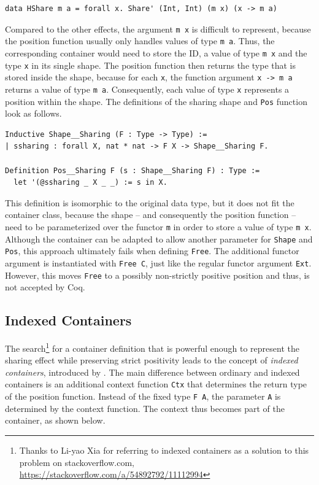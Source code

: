\documentclass[a4paper, 11pt, fleqn, twoside]{scrreprt}
\newcommand{\hinl}[1]{\texttt{#1}}
\newcommand{\cinl}[1]{\texttt{#1}}
\begin{document}
\begin{verbatim}
data HShare m a = forall x. Share' (Int, Int) (m x) (x -> m a)
\end{verbatim}

Compared to the other effects, the argument \hinl{m x} is difficult to represent, because the position function usually only handles values of type \hinl{m a}.
Thus, the corresponding container would need to store the ID, a value of type \hinl{m x} and the type \hinl{x} in its single shape.
The position function then returns the type that is stored inside the shape, because for each \hinl{x}, the function argument \hinl{x -> m a} returns a value of type \hinl{m a}.
Consequently, each value of type \cinl{x} represents a position within the shape.
The definitions of the sharing shape and \cinl{Pos} function look as follows.

\begin{verbatim}
Inductive Shape__Sharing (F : Type -> Type) :=
| ssharing : forall X, nat * nat -> F X -> Shape__Sharing F.

Definition Pos__Sharing F (s : Shape__Sharing F) : Type :=
  let '(@ssharing _ X _ _) := s in X.
\end{verbatim}

This definition is isomorphic to the original data type, but it does not fit the container class, because the shape -- and consequently the position function -- need to be parameterized over the functor \hinl{m} in order to store a value of type \hinl{m x}.
Although the container can be adapted to allow another parameter for \cinl{Shape} and \cinl{Pos}, this approach ultimately fails when defining \cinl{Free}.
The additional functor argument is instantiated with \cinl{Free C}, just like the regular functor argument \cinl{Ext}.
However, this moves \cinl{Free} to a possibly non-strictly positive position and thus, is not accepted by Coq.

\subsection{Indexed Containers}
The search\footnote{Thanks to Li-yao Xia for referring to indexed containers as a solution to this problem on stackoverflow.com, \url{https://stackoverflow.com/a/54892792/11112994}} for a container definition that is powerful enough to represent the sharing effect while preserving strict positivity leads to the concept of \textit{indexed containers}, introduced by \citet{altenkirch2009indexed}. 
The main difference between ordinary and indexed containers is an additional context function \cinl{Ctx} that determines the return type of the position function.
Instead of the fixed type \hinl{F A}, the parameter \cinl{A} is determined by the context function.
The context thus becomes part of the container, as shown below.
\end{document}
